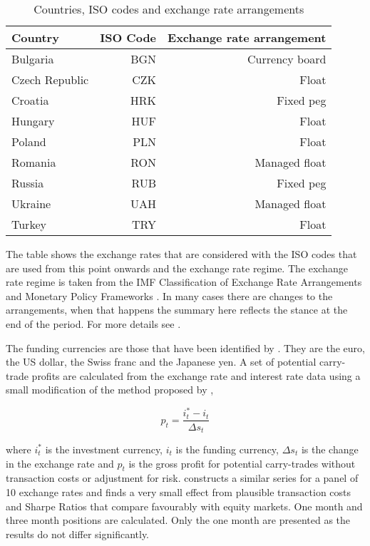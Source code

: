 \documentclass[12pt, a4paper, oneside]{article}\usepackage[]{graphicx}\usepackage[]{color}
\begin{document}
\begin{table}[t]
\begin{threeparttable}
\centering
\begin{tabular}{lrr}
  \hline
Country & ISO Code & Exchange rate arrangement\\
  \hline
Bulgaria & BGN & Currency board\\
Czech Republic & CZK & Float\\
Croatia & HRK & Fixed peg\\
Hungary & HUF & Float \\
Poland & PLN & Float\\
Romania & RON & Managed float\\
Russia & RUB & Fixed peg\\
Ukraine & UAH & Managed float\\
Turkey & TRY & Float\\
   \hline
\end{tabular}
\begin{tablenotes}
\small
\item The table shows the exchange rates that are considered with the ISO codes that are used from this point onwards and the exchange rate regime.  The exchange rate regime is taken from the IMF Classification of Exchange Rate Arrangements and Monetary Policy Frameworks \citet{IMFregime}. In many cases there are changes to the arrangements, when that happens the summary here reflects the stance at the end of the period.  For more details see \citet{Hayward2014}.  
\end{tablenotes}
\caption{Countries, ISO codes and exchange rate arrangements}
\label{tabref:exrate}
\end{threeparttable}
\end{table}

The funding currencies are those that have been identified by \citet{FTS}. They are the euro, the US dollar, the Swiss franc and the Japanese yen. A set of potential carry-trade profits are calculated from the exchange rate and interest rate data using a small modification of the method proposed by \citet{BrunnermeierCarry},   

\begin{equation}
p_t = \frac{i^*_t - i_t}{\Delta s_t}
\end{equation} 

where $i_t^*$ is the investment currency, $i_t$ is the funding currency, $\Delta s_t$ is the change in the exchange rate and $p_t$ is the gross profit for potential carry-trades without transaction costs or adjustment for risk.  \citet{Burnside2010} constructs a similar series for a panel of 10 exchange rates and finds a very small effect from plausible transaction costs and Sharpe Ratios that compare favourably with equity markets.  One month and three month positions are calculated. Only the one month are presented as the results do not differ significantly. 
\end{document}
